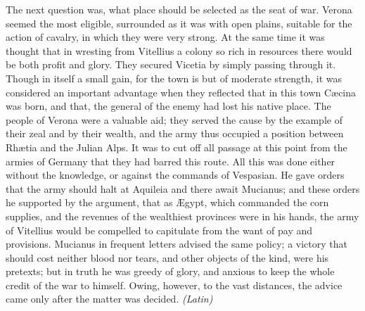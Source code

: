 The next question was, what place should be selected as the seat of war. Verona seemed the most eligible, surrounded as it was with open plains, suitable for the action of cavalry, in which they were very strong. At the same time it was thought that in wresting from Vitellius a colony so rich in resources there would be both profit and glory. They secured Vicetia by simply passing through it. Though in itself a small gain, for the town is but of moderate strength, it was considered an important advantage when they reflected that in this town Cæcina was born, and that, the general of the enemy had lost his native place. The people of Verona were a valuable aid; they served the cause by the example of their zeal and by their wealth, and the army thus occupied a position between Rhætia and the Julian Alps. It was to cut off all passage at this point from the armies of Germany that they had barred this route. All this was done either without the knowledge, or against the commands of Vespasian. He gave orders that the army should halt at Aquileia and there await Mucianus; and these orders he supported by the argument, that as Ægypt, which commanded the corn supplies, and the revenues of the wealthiest provinces were in his hands, the army of Vitellius would be compelled to capitulate from the want of pay and provisions. Mucianus in frequent letters advised the same policy; a victory that should cost neither blood nor tears, and other objects of the kind, were his pretexts; but in truth he was greedy of glory, and anxious to keep the whole credit of the war to himself. Owing, however, to the vast distances, the advice came only after the matter was decided. \emph{(Latin)}


